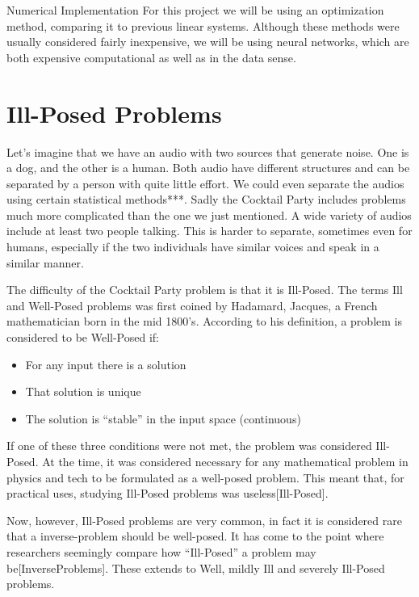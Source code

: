 \documentclass{book}
\begin{document}
Numerical Implementation
    For this project we will be using an optimization method, comparing it to previous linear systems. Although these methods were usually considered fairly inexpensive, we will be using neural networks, which are both expensive computational as well as in the data sense. 


\section{Ill-Posed Problems}
\qquad Let's imagine that we have an audio with two sources that generate noise. One is a dog, and the other is a human. Both audio have different structures and can be separated by a person with quite little effort. We could even separate the audios using certain statistical methods***. Sadly the Cocktail Party includes problems much more complicated than the one we just mentioned. A wide variety of audios include at least two people talking. This is harder to separate, sometimes even for humans, especially if the two individuals have similar voices and speak in a similar manner.
\par
    The difficulty of the Cocktail Party problem is that it is Ill-Posed. The terms Ill and Well-Posed problems was first coined by Hadamard, Jacques, a French mathematician born in the mid 1800’s. According to his definition, a problem is considered to be Well-Posed if: 
\begin{itemize}
    \item For any input there is a solution
    \item That solution is unique
    \item The solution is “stable” in the input space (continuous)
\end{itemize}
    If one of these three conditions were not met, the problem was considered Ill-Posed. At the time, it was considered necessary for any mathematical problem in physics and tech to be formulated as a well-posed problem. This meant that, for practical uses, studying Ill-Posed problems was useless[Ill-Posed].

    Now, however, Ill-Posed problems are very common, in fact it is considered rare that a inverse-problem should be well-posed. It has come to the point where researchers seemingly compare how “Ill-Posed” a problem may be[InverseProblems]. These extends to Well, mildly Ill and severely Ill-Posed problems.
\end{document}
